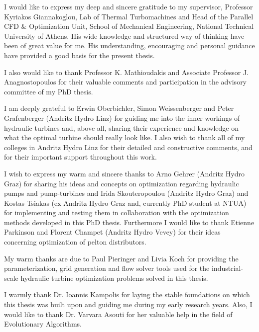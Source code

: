 

\begin{acknowledgements}      %
I would like to express my deep and sincere gratitude to my supervisor, Professor Kyriakos Giannakoglou, Lab of Thermal Turbomachines and Head of the Parallel CFD \& Optimization Unit, School of Mechanical Engineering, National Technical University of Athens. His wide knowledge and structured way of thinking have been of great value for me. His understanding, encouraging and personal guidance have provided a good basis for the present thesis.

I also would like to thank Professor K. Mathioudakis and Associate Professor J. Anagnostopoulos for their valuable comments and participation in the advisory committee of my PhD thesis.

I am deeply grateful to Erwin Oberbichler, Simon Weissenberger and Peter Grafenberger (Andritz Hydro Linz) for guiding me into the inner workings of hydraulic turbines and, above all, sharing their experience and knowledge on what the optimal turbine should really look like. I also wish to thank all of my colleges in Andritz Hydro Linz for their detailed and constructive comments, and for their important support throughout this work. 

I wish to express my warm and sincere thanks to Arno Gehrer (Andritz Hydro Graz) for sharing his ideas and concepts on optimization regarding hydraulic pumps and pump-turbines and Irida Skouteropoulou (Andritz Hydro Graz) and Kostas Tsiakas (ex Andritz Hydro Graz and, currently PhD student at NTUA) for implementing and testing them in collaboration with the optimization methods developed in this PhD thesis. Furthermore I would like to thank Etienne Parkinson and  Florent Champet (Andritz Hydro Vevey) for their ideas concerning optimization of pelton distributors. 

My warm thanks are due to Paul Pieringer and Livia Koch for providing the parameterization, grid generation and flow solver tools used for the industrial-scale hydraulic turbine optimization problems solved in this thesis.      

I warmly thank Dr. Ioannis Kampolis for laying the stable foundations on which this thesis was built upon and guiding me during my early research years. Also, I would like to thank Dr. Varvara Asouti for her valuable help in the field of Evolutionary Algorithms.


\end{acknowledgements}
